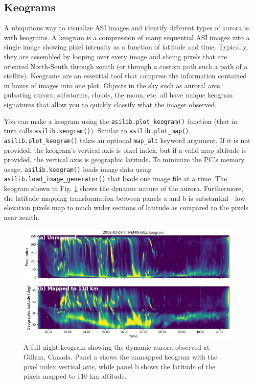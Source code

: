 \documentclass[draft]{agujournal2019}
\begin{document}
\subsection{Keograms}
A ubiquitous way to visualize ASI images and identify different types of aurora is with keograms. A keogram is a compression of many sequential ASI images into a single image showing pixel intensity as a function of latitude and time. Typically, they are assembled by looping over every image and slicing pixels that are oriented North-South through zenith (or through a custom path such a path of a stellite). Keograms are an essential tool that compress the information contained in hours of images into one plot. Objects in the sky such as auroral arcs, pulsating aurora, substorms, clouds, the moon, etc. all have unique keogram signatures that allow you to quickly classify what the imager observed. 

You can make a keogram using the \verb|asilib.plot_keogram()| function (that in turn calls \verb|asilib.keogram()|). Similar to \verb|asilib.plot_map()|, \verb|asilib.plot_keogram()| takes an optional \verb|map_alt| keyword argument. If it is not provided, the keogram's vertical axis is pixel index, but if a valid map altitude is provided, the vertical axis is geographic latitude. To minimize the PC's memory usage, \verb|asilib.keogram()| loads image data using \verb|asilib.load_image_generator()| that loads one image file at a time. The keogram shown in Fig. \ref{fig3} shows the dynamic nature of the aurora. Furthermore, the latitude  mapping transformation between panels a and b is substantial---low elevation pixels map to much wider sections of latitude as compared to the pixels near zenith.

\begin{figure}
      \includegraphics[width=\textwidth]{figures/fig3.png}
      \caption{A full-night keogram showing the dynamic aurora observed at Gillam, Canada. Panel a shows the unmapped keogram with the pixel index vertical axis, while panel b shows the latitude of the pixels mapped to 110 km altitude.}
      \label{fig3}
\end{figure}
\end{document}
